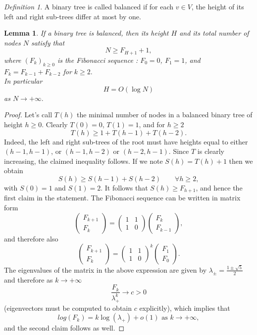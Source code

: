 \documentclass[12pt]{article}
\theoremstyle{plain}
\newtheorem{lemma}{Lemma}
\theoremstyle{remark}
\newtheorem*{definition}{Definition}
\begin{document}
\begin{definition} A binary tree is called balanced if for each $v \in V$, the
	height of its left and right sub-trees differ at most by one.
\end{definition}
\begin{lemma}
If a binary tree is balanced, then its height $H$ and its total number
of nodes $N$ satisfy that
$$
	N \geq  F_{H + 1} + 1,
$$
	where $(F_k)_{k \geq 0}$ is the Fibonacci sequence : $F_0 = 0$, $F_1 =
	1$, and $F_{k} = F_{k - 1} + F_{k-2}$ for $k \geq 2.$\\
	In particular 
	$$H = O(\log N)$$
	as $N \to +\infty.$
\end{lemma}
\begin{proof}
	Let's call $T(h)$ the minimal number of nodes in a balanced binary tree of height
	$h \geq 0$. Clearly $T(0) = 0$, $T(1) = 1$, and for $h \geq 2$
	$$
	T(h) \geq 1 + T(h-1) + T(h-2).
	$$
	Indeed, the left and right sub-trees of the root must have heights equal
	to either $(h-1, h-1)$, or $(h-1, h-2)$ or $(h-2, h-1)$. Since $T$ is
	clearly increasing, the claimed inequality follows. If we note $S(h) =
	T(h) + 1$ then we obtain
	$$
	S(h) \geq S(h-1) + S(h-2) \qquad \forall h \geq 2,
	$$
	with $S(0) = 1$ and $S(1) = 2.$ It follows that $S(h) \geq F_{h+1}$, and
	hence the first claim in the statement. The Fibonacci sequence can be
	written in matrix form
	$$
	\begin{pmatrix} F_{k+1} \\ F_k \end{pmatrix} = 
		\begin{pmatrix} 1 & 1 \\ 1 & 0 \end{pmatrix} 
		\begin{pmatrix} F_{k} \\ F_{k-1} \end{pmatrix}, 
	$$
	and therefore also
	$$
	\begin{pmatrix} F_{k+1} \\ F_k \end{pmatrix} = 
		\begin{pmatrix} 1 & 1 \\ 1 & 0 \end{pmatrix}^k 
		\begin{pmatrix} F_{1} \\ F_{0} \end{pmatrix}. 
	$$
	The eigenvalues of the matrix in the above expression are given by
	$\lambda_\pm = \frac{1 \pm \sqrt{5}}{2}$ and therefore as $k \to
	+\infty$
	$$
	\frac{F_k}{ \lambda_+^{k}} \to c > 0
	$$
	(eigenvectors must be computed to obtain $c$ explicitly), which implies that
	$$
	log(F_k) = k\log(\lambda_+) + o(1) \text{ as } k \to +\infty,
	$$
	and the second claim follows as well.
\end{proof}
\end{document}
